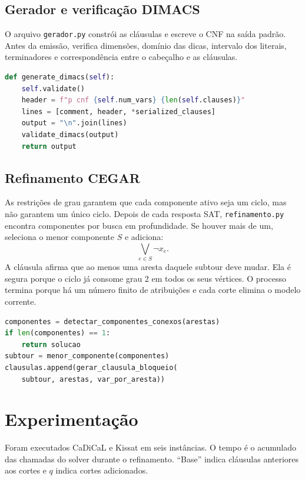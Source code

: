 \documentclass[11pt,a4paper]{article}
\begin{document}
\subsection{Gerador e verificação DIMACS}
O arquivo \texttt{gerador.py} constrói as cláusulas e escreve o CNF na saída padrão. Antes da emissão, verifica dimensões, domínio das dicas, intervalo dos literais, terminadores e correspondência entre o cabeçalho e as cláusulas.
\begin{lstlisting}[language=Python]
def generate_dimacs(self):
    self.validate()
    header = f"p cnf {self.num_vars} {len(self.clauses)}"
    lines = [comment, header, *serialized_clauses]
    output = "\n".join(lines)
    validate_dimacs(output)
    return output
\end{lstlisting}

\subsection{Refinamento CEGAR}
As restrições de grau garantem que cada componente ativo seja um ciclo, mas não garantem um único ciclo. Depois de cada resposta SAT, \texttt{refinamento.py} encontra componentes por busca em profundidade. Se houver mais de um, seleciona o menor componente $S$ e adiciona:
\[
\bigvee_{e\in S}\neg x_e.
\]
A cláusula afirma que ao menos uma aresta daquele subtour deve mudar. Ela é segura porque o ciclo já consome grau 2 em todos os seus vértices. O processo termina porque há um número finito de atribuições e cada corte elimina o modelo corrente.
\begin{lstlisting}[language=Python]
componentes = detectar_componentes_conexos(arestas)
if len(componentes) == 1:
    return solucao
subtour = menor_componente(componentes)
clausulas.append(gerar_clausula_bloqueio(
    subtour, arestas, var_por_aresta))
\end{lstlisting}
\newpage

\section{Experimentação}
Foram executados CaDiCaL e Kissat em seis instâncias. O tempo é o acumulado das chamadas do solver durante o refinamento. ``Base'' indica cláusulas anteriores aos cortes e $q$ indica cortes adicionados.
\end{document}
